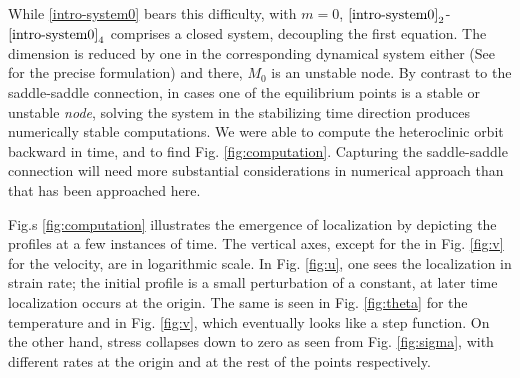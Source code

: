 \documentclass[a4paper,11pt]{article}
\theoremstyle{remark}
\begin{document}
While \eqref{intro-system0} bears this difficulty, with $m=0$, $\eqref{intro-system0}_2$-$\eqref{intro-system0}_4$ comprises a closed system, decoupling the first equation. The dimension is reduced by one in the corresponding dynamical system either (See \cite{KLT_HYP2016} for the precise formulation) and there, $M_0$ is an unstable node. By contrast to the saddle-saddle connection, in cases one of the equilibrium points is a stable or unstable {\it node}, solving the system in the stabilizing time direction produces numerically stable computations. We were able to compute the heteroclinic orbit backward in time, and to find Fig. \ref{fig:computation}. Capturing the saddle-saddle connection will need more substantial considerations in numerical approach than that has been approached here.


Fig.s \ref{fig:computation} illustrates the emergence of localization by depicting the profiles at a few instances of time. The vertical axes, except for the in Fig. \ref{fig:v} for the velocity, are in logarithmic scale. In Fig. \ref{fig:u}, one sees the localization in strain rate; the initial profile is a small perturbation of
a constant, at later time localization occurs at the origin. The same is seen in Fig. \ref{fig:theta} 
for the temperature and in  Fig. \ref{fig:v}, which eventually looks like a step function. On the other hand, stress collapses down to zero as seen from Fig. \ref{fig:sigma}, with different rates at the origin and at the rest of the points respectively.
\end{document}
